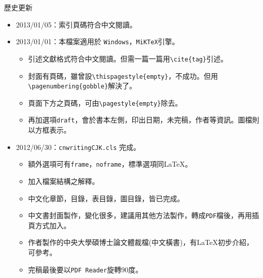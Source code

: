 \begin{preface}
歷史更新
\begin{itemize}
\item 2013/01/05：索引頁碼符合中文閱讀。
\item 2013/01/01：本檔案適用於 {\tt Windows}，{\tt MiKTeX}引擎。
\begin{itemize}
\item 引述文獻格式符合中文閱讀。但需一篇一篇用\verb|\cite{tag}|引述。
\item 封面有頁碼，雖曾設\verb|\thispagestyle{empty}|，不成功。但用\verb|\pagenumbering{gobble}|解決了。
\item 頁面下方之頁碼，可由\verb|\pagestyle{empty}|除去。
\item 再加選項{\tt draft}，會於書本左側，印出日期，未完稿，作者等資訊。圖檔則以方框表示。
\end{itemize}
\item 2012/06/30：{\tt cnwritingCJK.cls} 完成。
\begin{itemize}
\item 額外選項可有{\tt frame}，{\tt noframe}，標準選項同\LaTeX。
\item 加入檔案結構之解釋。
\item 中文化章節，目錄，表目錄，圖目錄，皆已完成。
\item 中文書封面製作，變化很多，建議用其他方法製作\cite{interm}，轉成{\tt PDF}檔後，再用插頁方式加入。
\item 作者製作的中央大學碩博士論文體裁檔(中文橫書)，有\LaTeX{}初步介紹，可參考。
\item 完稿最後要以{\tt PDF Reader}旋轉90度。
\end{itemize}
\end{itemize}
\end{preface}